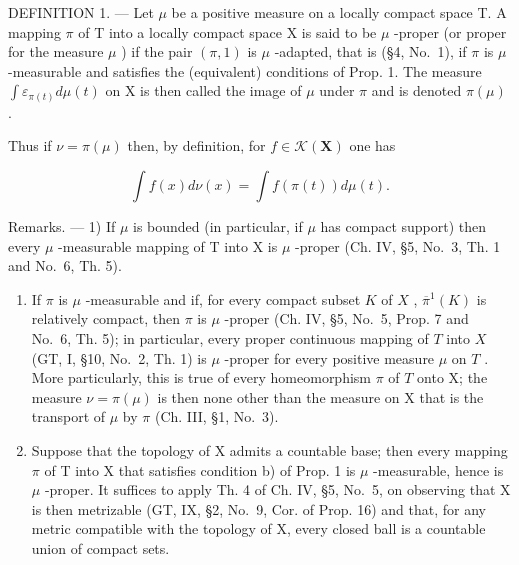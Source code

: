 DEFINITION 1. --- Let \(\mu\) be a positive measure on a locally compact space T. A mapping \(\pi\) of T into a locally compact space X is said to be \(\mu\) -proper (or proper for the measure \(\mu\) ) if the pair \((\pi,1)\) is \(\mu\) -adapted, that is (§4, No.~1), if \(\pi\) is \(\mu\) -measurable and satisfies the (equivalent) conditions of Prop. 1. The measure \(\int \varepsilon_{\pi(t)} d\mu(t)\) on X is then called the image of \(\mu\) under \(\pi\) and is denoted \(\pi(\mu)\) .

Thus if \(\nu = \pi (\mu)\) then, by definition, for \(f\in \mathcal{K}(\mathbf{X})\) one has

\[
\int f (x) d \nu (x) = \int f (\pi (t)) d \mu (t).\tag{1}
\]

Remarks. --- 1) If \(\mu\) is bounded (in particular, if \(\mu\) has compact support) then every \(\mu\) -measurable mapping of T into X is \(\mu\) -proper (Ch. IV, §5, No.~3, Th. 1 and No.~6, Th. 5).

\begin{enumerate}
\def\labelenumi{\arabic{enumi})}
\setcounter{enumi}{1}
\item
  If \(\pi\) is \(\mu\) -measurable and if, for every compact subset \(K\) of \(X\) , \(\overline{\pi}^{1}(K)\) is relatively compact, then \(\pi\) is \(\mu\) -proper (Ch. IV, §5, No.~5, Prop. 7 and No.~6, Th. 5); in particular, every proper continuous mapping of \(T\) into \(X\) (GT, I, §10, No.~2, Th. 1) is \(\mu\) -proper for every positive measure \(\mu\) on \(T\) . More particularly, this is true of every homeomorphism \(\pi\) of \(T\) onto X; the measure \(\nu = \pi(\mu)\) is then none other than the measure on X that is the transport of \(\mu\) by \(\pi\) (Ch. III, §1, No.~3).
\item
  Suppose that the topology of X admits a countable base; then every mapping \(\pi\) of T into X that satisfies condition b) of Prop. 1 is \(\mu\) -measurable, hence is \(\mu\) -proper. It suffices to apply Th. 4 of Ch. IV, §5, No.~5, on observing that X is then metrizable (GT, IX, §2, No.~9, Cor. of Prop. 16) and that, for any metric compatible with the topology of X, every closed ball is a countable union of compact sets.
\end{enumerate}

